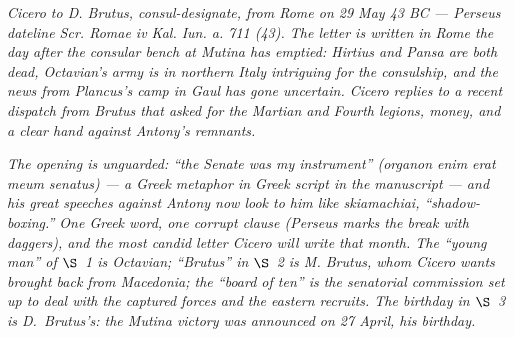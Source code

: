 
\textit{Cicero to D. Brutus, consul-designate, from Rome on
29 May 43 BC --- Perseus dateline \textit{Scr. Romae iv Kal.
Iun. a. 711 (43)}. The letter is written in Rome the day
after the consular bench at Mutina has emptied: Hirtius and
Pansa are both dead, Octavian's army is in northern Italy
intriguing for the consulship, and the news from Plancus's
camp in Gaul has gone uncertain. Cicero replies to a
recent dispatch from Brutus that asked for the Martian and
Fourth legions, money, and a clear hand against Antony's
remnants.}

\textit{The opening is unguarded: ``the Senate was my
instrument'' (\textit{organon enim erat meum senatus}) ---
a Greek metaphor in Greek script in the manuscript --- and
his great speeches against Antony now look to him like
\textit{skiamachiai}, ``shadow-boxing.'' One Greek word, one
corrupt clause (Perseus marks the break with daggers), and
the most candid letter Cicero will write that month. The
``young man'' of $\S$~1 is Octavian; ``Brutus'' in $\S$~2 is M.
Brutus, whom Cicero wants brought back from Macedonia; the
``board of ten'' is the senatorial commission set up to deal
with the captured forces and the eastern recruits. The
birthday in $\S$~3 is D.~Brutus's: the Mutina victory was
announced on 27 April, his birthday.}
